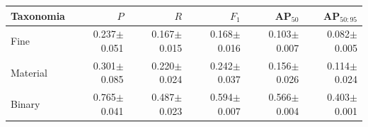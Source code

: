 \begin{tabular}{lrrrrr}
\toprule
Taxonomia & $P$ & $R$ & $F_1$ & AP$_{50}$ & AP$_{50:95}$ \\
\midrule
Fine & 0.237$\pm$0.051 & 0.167$\pm$0.015 & 0.168$\pm$0.016 & 0.103$\pm$0.007 & 0.082$\pm$0.005 \\
Material & 0.301$\pm$0.085 & 0.220$\pm$0.024 & 0.242$\pm$0.037 & 0.156$\pm$0.026 & 0.114$\pm$0.024 \\
Binary & 0.765$\pm$0.041 & 0.487$\pm$0.023 & 0.594$\pm$0.007 & 0.566$\pm$0.004 & 0.403$\pm$0.001 \\
\bottomrule
\end{tabular}
